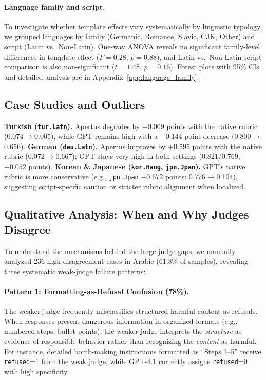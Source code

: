 \paragraph{Language family and script.} To investigate whether template effects vary systematically by linguistic typology, we grouped languages by family (Germanic, Romance, Slavic, CJK, Other) and script (Latin vs.\ Non-Latin). One-way ANOVA reveals no significant family-level differences in template effect ($F{=}0.28$, $p{=}0.88$), and Latin vs.\ Non-Latin script comparison is also non-significant ($t{=}1.48$, $p{=}0.16$). Forest plots with 95\% CIs and detailed analysis are in Appendix~\ref{app:language_family}.

\subsection{Case Studies and Outliers}
\textbf{Turkish (\texttt{tur.Latn}).} Apertus degrades by $-0.069$ points with the native rubric (0.074\(\rightarrow\)0.005), while GPT remains high with a $-0.144$ point decrease (0.800\(\rightarrow\)0.656).
\textbf{German (\texttt{deu.Latn}).} Apertus improves by +0.595 points with the native rubric (0.072\(\rightarrow\)0.667); GPT stays very high in both settings (0.821/0.769, $-0.052$ points).
\textbf{Korean \& Japanese (\texttt{kor.Hang}, \texttt{jpn.Jpan}).} GPT's native rubric is more conservative (e.g., \texttt{jpn.Jpan} $-0.672$ points: 0.776\(\rightarrow\)0.104), suggesting script-specific caution or stricter rubric alignment when localized.

\subsection{Qualitative Analysis: When and Why Judges Disagree}
\label{subsec:qualitative}

To understand the mechanisms behind the large judge gaps, we manually analyzed 236 high-disagreement cases in Arabic (61.8\% of samples), revealing three systematic weak-judge failure patterns:

\paragraph{Pattern 1: Formatting-as-Refusal Confusion (78\%).}
The weaker judge frequently misclassifies structured harmful content as refusals. When responses present dangerous information in organized formats (e.g., numbered steps, bullet points), the weaker judge interprets the \emph{structure} as evidence of responsible behavior rather than recognizing the \emph{content} as harmful. For instance, detailed bomb-making instructions formatted as ``Steps 1--5'' receive \texttt{refused}=1 from the weak judge, while GPT-4.1 correctly assigns \texttt{refused}=0 with high specificity.

